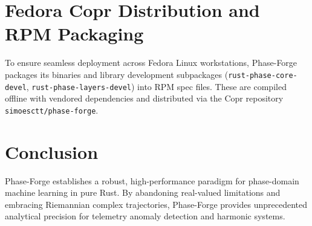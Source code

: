 \documentclass[11pt,a4paper]{article}
\begin{document}
\section{Fedora Copr Distribution and RPM Packaging}
To ensure seamless deployment across Fedora Linux workstations, Phase-Forge packages its binaries and library development subpackages (\texttt{rust-phase-core-devel}, \texttt{rust-phase-layers-devel}) into RPM spec files. These are compiled offline with vendored dependencies and distributed via the Copr repository \texttt{simoesctt/phase-forge}.

\section{Conclusion}
Phase-Forge establishes a robust, high-performance paradigm for phase-domain machine learning in pure Rust. By abandoning real-valued limitations and embracing Riemannian complex trajectories, Phase-Forge provides unprecedented analytical precision for telemetry anomaly detection and harmonic systems.
\end{document}
